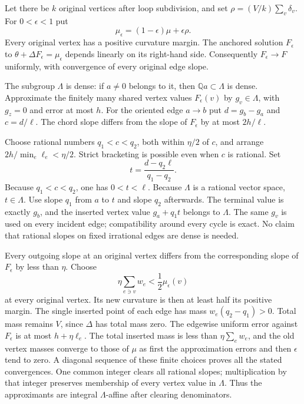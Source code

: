 \documentclass[
  11pt,
]{article}
\begin{document}
Let there be \(k\) original vertices after loop subdivision, and set
\(\rho=(V/k)\sum_v\delta_v\). For \(0<\epsilon<1\) put \[
 \mu_\epsilon=(1-\epsilon)\mu+\epsilon\rho.
\] Every original vertex has a positive curvature margin. The anchored
solution \(F_\epsilon\) to \(\theta+\Delta F_\epsilon=\mu_\epsilon\)
depends linearly on its right-hand side. Consequently
\(F_\epsilon\to F\) uniformly, with convergence of every original edge
slope.

The subgroup \(\Lambda\) is dense: if \(a\ne0\) belongs to it, then
\(\mathbb Qa\subset\Lambda\) is dense. Approximate the finitely many
shared vertex values \(F_\epsilon(v)\) by \(g_v\in\Lambda\), with
\(g_z=0\) and error at most \(h\). For the oriented edge \(a\to b\) put
\(d=g_b-g_a\) and \(c=d/\ell\). The chord slope differs from the slope
of \(F_\epsilon\) by at most \(2h/\ell\).

Choose rational numbers \(q_1<c<q_2\), both within \(\eta/2\) of \(c\),
and arrange \(2h/\min_e\ell_e<\eta/2\). Strict bracketing is possible
even when \(c\) is rational. Set \[
 t=\frac{d-q_2\ell}{q_1-q_2}.
\] Because \(q_1<c<q_2\), one has \(0<t<\ell\). Because \(\Lambda\) is a
rational vector space, \(t\in\Lambda\). Use slope \(q_1\) from \(a\) to
\(t\) and slope \(q_2\) afterwards. The terminal value is exactly
\(g_b\), and the inserted vertex value \(g_a+q_1t\) belongs to
\(\Lambda\). The same \(g_v\) is used on every incident edge;
compatibility around every cycle is exact. No claim that rational slopes
on fixed irrational edges are dense is needed.

Every outgoing slope at an original vertex differs from the
corresponding slope of \(F_\epsilon\) by less than \(\eta\). Choose \[
 \eta\sum_{e\ni v}w_e<\frac12\mu_\epsilon(v)
\] at every original vertex. Its new curvature is then at least half its
positive margin. The single inserted point of each edge has mass
\(w_e(q_2-q_1)>0\). Total mass remains \(V\), since \(\Delta\) has total
mass zero. The edgewise uniform error against \(F_\epsilon\) is at most
\(h+\eta\ell_e\). The total inserted mass is less than
\(\eta\sum_ew_e\), and the old vertex masses converge to those of
\(\mu\) as first the approximation errors and then \(\epsilon\) tend to
zero. A diagonal sequence of these finite choices proves all the stated
convergences. One common integer clears all rational slopes;
multiplication by that integer preserves membership of every vertex
value in \(\Lambda\). Thus the approximants are integral
\(\Lambda\)-affine after clearing denominators.
\end{document}
